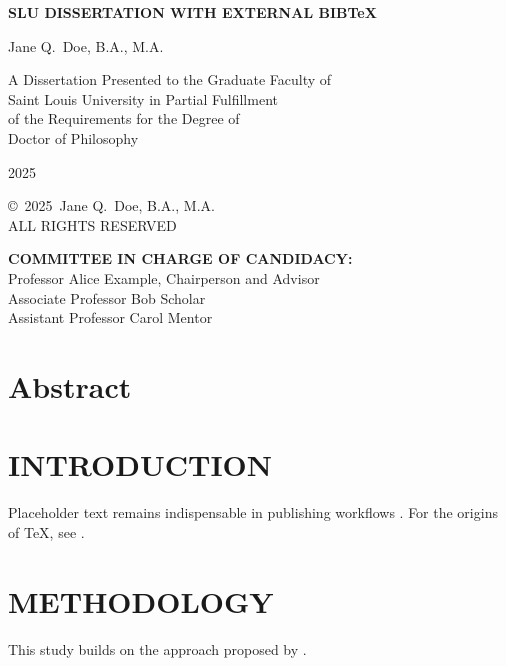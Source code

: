 \documentclass[12pt,oneside]{book}
\newcommand{\thesistitle}{SLU DISSERTATION WITH EXTERNAL BIB\TeX{}}
\newcommand{\authorname}{Jane Q.\ Doe, B.A., M.A.}
\newcommand{\degree}{Doctor of Philosophy}
\newcommand{\graduationyear}{2025}
\newcommand{\committeelist}{%
Professor Alice Example, Chairperson and Advisor\\[1em]
Associate Professor Bob Scholar\\[1em]
Assistant Professor Carol Mentor}
\begin{document}
\begin{titlepage}
\begin{center}
\doublespacing
{\Large\bfseries \thesistitle\par}
\vfill
\authorname\par
\vfill
A Dissertation Presented to the Graduate Faculty of\\
Saint Louis University in Partial Fulfillment\\
of the Requirements for the Degree of\\[1em]
\degree\par
\vfill
\graduationyear
\end{center}
\end{titlepage}

\clearpage
{}\setcounter{page}{1}
\thispagestyle{plain}
\begin{center}
\copyright\ \graduationyear\ \authorname\\
ALL RIGHTS RESERVED
\end{center}
\clearpage

\thispagestyle{plain}
\noindent\textbf{COMMITTEE IN CHARGE OF CANDIDACY:}\\[2em]
\committeelist
\clearpage

\chapter*{Abstract}
\singlespacing
\lipsum[1]
\doublespacing\clearpage

\tableofcontents\clearpage
\listoftables\clearpage
\listoffigures\clearpage

\mainmatter

\chapter{INTRODUCTION}
Placeholder text remains indispensable in publishing workflows \citep{ipsum2020}.  
For the origins of \TeX{}, see \citet{knuth1986}.

\chapter{METHODOLOGY}
This study builds on the approach proposed by \citep{doe2024}.
\end{document}
